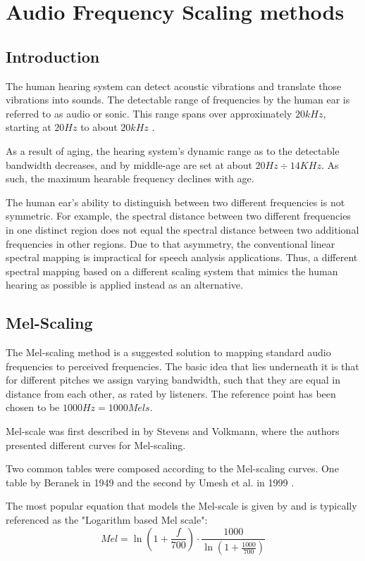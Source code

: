 \chapter{Audio Frequency Scaling methods}\label{ch:scaling_methods}
\section{Introduction}
The human hearing system can detect 
acoustic vibrations and translate 
those vibrations into sounds.
The detectable range of frequencies by the human ear
is referred to as audio or sonic. This range
spans over approximately \(20kHz\),
starting at \(20Hz\) to about \(20kHz\)
\cite{hearthres}.

As a result of aging, the hearing system's dynamic range 
as to the detectable bandwidth decreases,
and by middle-age are set at about
\(20Hz \div 14KHz\)\cite{Wiley2008ChangesIH}.
As such, the maximum hearable frequency
declines with age.

The human ear's ability to distinguish 
between two different frequencies 
is not symmetric. 
For example, the spectral distance between two 
different frequencies in one distinct region does 
not equal the spectral distance 
between two additional frequencies in other regions.
Due to that asymmetry, the conventional linear 
spectral mapping is impractical for
speech analysis applications.
Thus, a different spectral mapping 
based on a different scaling system
that mimics the human hearing as possible
is applied instead as an alternative.

\section{Mel-Scaling}
The Mel-scaling method 
is a suggested solution to mapping 
standard audio frequencies to perceived frequencies.
The basic idea that lies underneath it is that for
different pitches we assign varying bandwidth,
such that they are equal in distance
from each other, as rated by listeners.
The reference point has been chosen to be 
\(1000 Hz = 1000 Mels\).

Mel-scale was first described in \cite{Volkmann} by Stevens and Volkmann,
where the authors presented different curves for Mel-scaling.

Two common tables were composed
according to the Mel-scaling curves. One table by 
Beranek in 1949 \cite{beranek1988acoustical} 
and the second by Umesh et al. in 1999 \cite{UmeshMel}.

The most popular equation that models the Mel-scale
is given by \cite{o1987speech} and is typically referenced as
the "Logarithm based Mel scale":
\begin{equation}\label{eq:mel_1}
    Mel = \ln \left( 1 + \frac{f}{700} \right) \cdot \frac{1000}{\ln(1+\frac{1000}{700})} 
\end{equation}

